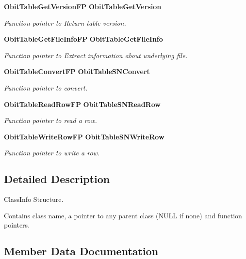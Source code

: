 \begin{CompactItemize}
{\bf Obit\-Table\-Get\-Version\-FP} {\bf Obit\-Table\-Get\-Version}
\begin{CompactList}\small\item\em Function pointer to Return table version. \item\end{CompactList}\item 
{\bf Obit\-Table\-Get\-File\-Info\-FP} {\bf Obit\-Table\-Get\-File\-Info}
\begin{CompactList}\small\item\em Function pointer to Extract information about underlying file. \item\end{CompactList}\item 
{\bf Obit\-Table\-Convert\-FP} {\bf Obit\-Table\-SNConvert}
\begin{CompactList}\small\item\em Function pointer to convert. \item\end{CompactList}\item 
{\bf Obit\-Table\-Read\-Row\-FP} {\bf Obit\-Table\-SNRead\-Row}
\begin{CompactList}\small\item\em Function pointer to read a row. \item\end{CompactList}\item 
{\bf Obit\-Table\-Write\-Row\-FP} {\bf Obit\-Table\-SNWrite\-Row}
\begin{CompactList}\small\item\em Function pointer to write a row. \item\end{CompactList}\end{CompactItemize}


\subsection{Detailed Description}
Class\-Info Structure. 

Contains class name, a pointer to any parent class (NULL if none) and function pointers. 



\subsection{Member Data Documentation}
